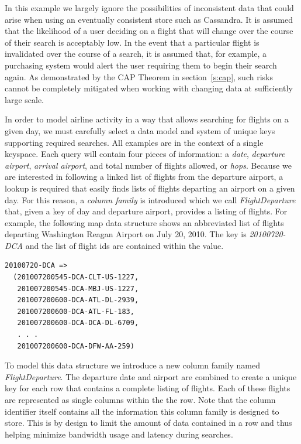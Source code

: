 \documentclass[twocolumn]{article}
\begin{document}
In this example we largely ignore the possibilities of inconsistent data that could arise when using an eventually consistent store such as Cassandra.  It is assumed that the likelihood of a user deciding on a flight that will change over the course of their search is acceptably low.  In the event that a particular flight is invalidated over the course of a search, it is assumed that, for example, a purchasing system would alert the user requiring them to begin their search again.  As demonstrated by the CAP Theorem in section~\ref{s:cap}, such risks cannot be completely mitigated when working with changing data at sufficiently large scale.

In order to model airline activity in a way that allows searching for flights on a given day, we must carefully select a data model and system of unique keys supporting required searches.  All examples are in the context of a single keyspace.  Each query will contain four pieces of information: a \emph{date}, \emph{departure airport}, \emph{arrival airport}, and total number of flights allowed, or \emph{hops}.  Because we are interested in following a linked list of flights from the departure airport, a lookup is required that easily finds lists of flights departing an airport on a given day.  For this reason, a \emph{column family} is introduced which we call \emph{FlightDeparture} that, given a key of day and departure airport, provides a listing of flights.  For example, the following map data structure shows an abbreviated list of flights departing Washington Reagan Airport on July 20, 2010.  The key is \emph{20100720-DCA} and the list of flight ids are contained within the value.

\begin{verbatim}
20100720-DCA =>
  (201007200545-DCA-CLT-US-1227,
   201007200545-DCA-MBJ-US-1227,
   201007200600-DCA-ATL-DL-2939,
   201007200600-DCA-ATL-FL-183,
   201007200600-DCA-DCA-DL-6709,
   . . .
   201007200600-DCA-DFW-AA-259)
\end{verbatim}

\noindent
To model this data structure we introduce a new column family named \emph{FlightDeparture}.  The departure date and airport are combined to create a unique key for each row that contains a complete listing of flights.  Each of these flights are represented as single columns within the the row.  Note that the column identifier itself contains all the information this column family is designed to store.  This is by design to limit the amount of data contained in a row and thus helping minimize bandwidth usage and latency during searches.
\end{document}
